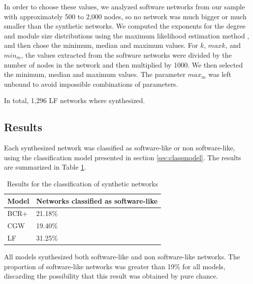 In order to choose these values, we analyzed software networks from our sample
with approximately 500 to 2,000 nodes, so no network was much bigger or much
smaller than the synthetic networks. We computed the exponents for the degree
and module size distributions using the maximum likelihood estimation method
\cite{Clauset2007}, and then chose the minimum, median and maximum values. For
$k$, $maxk$, and $min_m$, the values extracted from the software networks were
divided by the number of nodes in the network and then multiplied by 1000. We
then selected the minimum, median and maximum values. The parameter $max_m$ was
left unbound to avoid impossible combinations of parameters.

In total, 1,296 LF networks where synthesized.

\subsection{Results}

Each synthesized network was classified as software-like or non software-like,
using the classification model presented in section \ref{sec:classmodel}. The
results are summarized in Table \ref{tab:results}. 

\begin{table}
\caption{Results for the classification of synthetic networks}
\centering
\begin{tabular}{|l|l|}
\hline
Model & Networks classified as software-like \\
\hline 
\hline
BCR+ & 21.18\% \\ %
\hline
CGW  & 19.40\% \\  %
\hline
LF   & 31.25\% \\ %
\hline
\end{tabular}
\label{tab:results}
\end{table}

All models synthesized both software-like and non software-like networks. The
proportion of software-like networks was greater than 19\% for all models,
discarding the possibility that this result was obtained by pure chance.

%
%
%
%

